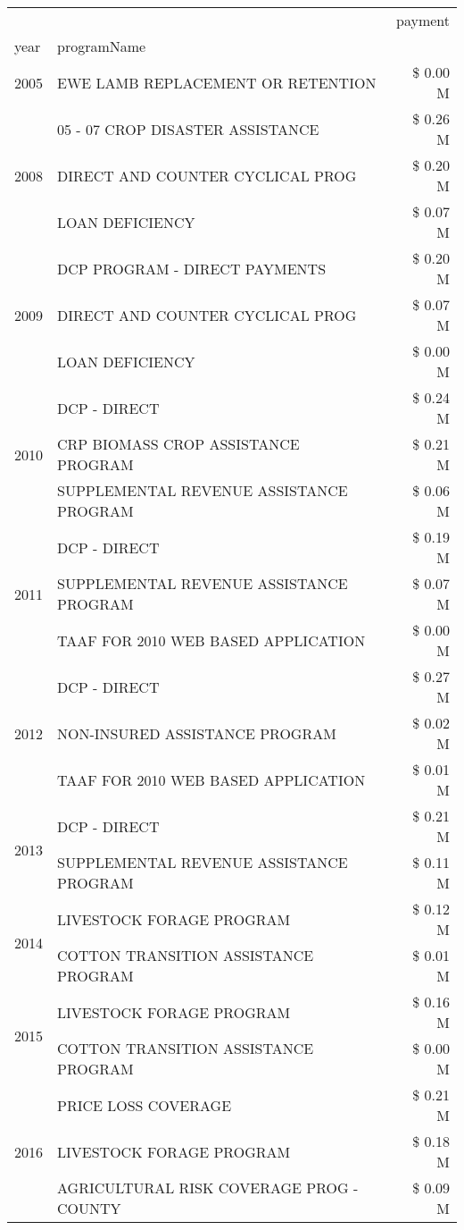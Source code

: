 \begin{tabular}{llr}
\toprule
 &  & payment \\
year & programName &  \\
\midrule
2005 & EWE LAMB REPLACEMENT OR RETENTION & \$ 0.00 M \\
\cline{1-3}
\multirow[t]{3}{*}{2008} & 05 - 07 CROP DISASTER ASSISTANCE & \$ 0.26 M \\
 & DIRECT AND COUNTER CYCLICAL PROG & \$ 0.20 M \\
 & LOAN DEFICIENCY & \$ 0.07 M \\
\cline{1-3}
\multirow[t]{3}{*}{2009} & DCP PROGRAM - DIRECT PAYMENTS & \$ 0.20 M \\
 & DIRECT AND COUNTER CYCLICAL PROG & \$ 0.07 M \\
 & LOAN DEFICIENCY & \$ 0.00 M \\
\cline{1-3}
\multirow[t]{3}{*}{2010} & DCP - DIRECT & \$ 0.24 M \\
 & CRP BIOMASS CROP ASSISTANCE PROGRAM & \$ 0.21 M \\
 & SUPPLEMENTAL REVENUE ASSISTANCE PROGRAM & \$ 0.06 M \\
\cline{1-3}
\multirow[t]{3}{*}{2011} & DCP - DIRECT & \$ 0.19 M \\
 & SUPPLEMENTAL REVENUE ASSISTANCE PROGRAM & \$ 0.07 M \\
 & TAAF FOR 2010 WEB BASED APPLICATION & \$ 0.00 M \\
\cline{1-3}
\multirow[t]{3}{*}{2012} & DCP - DIRECT & \$ 0.27 M \\
 & NON-INSURED ASSISTANCE PROGRAM & \$ 0.02 M \\
 & TAAF FOR 2010 WEB BASED APPLICATION & \$ 0.01 M \\
\cline{1-3}
\multirow[t]{2}{*}{2013} & DCP - DIRECT & \$ 0.21 M \\
 & SUPPLEMENTAL REVENUE ASSISTANCE PROGRAM & \$ 0.11 M \\
\cline{1-3}
\multirow[t]{2}{*}{2014} & LIVESTOCK FORAGE PROGRAM & \$ 0.12 M \\
 & COTTON TRANSITION ASSISTANCE PROGRAM & \$ 0.01 M \\
\cline{1-3}
\multirow[t]{2}{*}{2015} & LIVESTOCK FORAGE PROGRAM & \$ 0.16 M \\
 & COTTON TRANSITION ASSISTANCE PROGRAM & \$ 0.00 M \\
\cline{1-3}
\multirow[t]{3}{*}{2016} & PRICE LOSS COVERAGE & \$ 0.21 M \\
 & LIVESTOCK FORAGE PROGRAM & \$ 0.18 M \\
 & AGRICULTURAL RISK COVERAGE PROG - COUNTY & \$ 0.09 M \\

\end{tabular}
